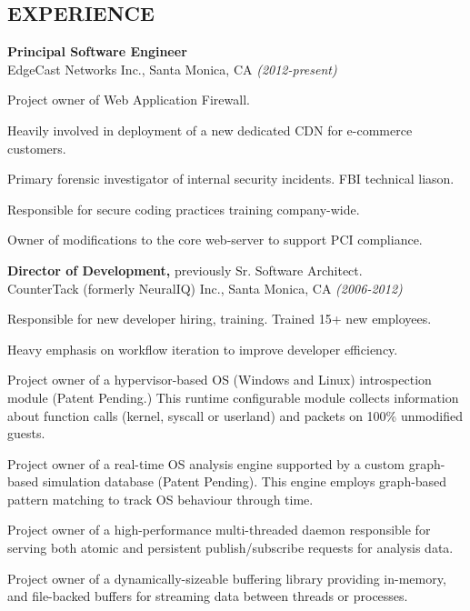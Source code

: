 \documentclass[margin]{res}
\begin{document}
\begin{resume}
\section{EXPERIENCE}
\noindent
{\bf Principal Software Engineer} \\ 
EdgeCast Networks Inc., Santa Monica, CA {\em (2012-present)}
\begin{list}{}{\leftmargin=1.5em \topsep=5pt \partopsep=0pt \parsep=2.5pt}
  \item Project owner of Web Application Firewall.
  \item Heavily involved in deployment of a new dedicated CDN for 
    e-commerce customers.
  \item Primary forensic investigator of internal security incidents.  
    FBI technical liason.
  \item Responsible for secure coding practices training company-wide.
  \item Owner of modifications to the core web-server to support PCI 
    compliance.
\end{list}

{\bf Director of Development,} previously Sr. Software Architect. \\ 
CounterTack (formerly NeuralIQ) Inc., Santa Monica, CA {\em (2006-2012)}
\begin{list}{}{\leftmargin=1.5em \topsep=5pt \partopsep=0pt \parsep=2.5pt}
  \item Responsible for new developer hiring, training.  Trained 15+ 
    new employees.
  \item Heavy emphasis on workflow iteration to improve developer 
    efficiency.
  \item Project owner of a hypervisor-based OS (Windows and
    Linux) introspection module (Patent Pending.)  This runtime
    configurable module collects information about function calls
    (kernel, syscall or userland) and packets on 100\%
    unmodified guests.
  \item Project owner of a real-time OS analysis engine supported by a
    custom graph-based simulation database (Patent Pending).  This
    engine employs graph-based pattern matching to track OS behaviour
    through time.
  \item Project owner of a high-performance multi-threaded daemon
    responsible for serving both atomic and persistent
    publish/subscribe requests for analysis data.
  \item Project owner of a dynamically-sizeable buffering library
    providing in-memory, and file-backed buffers for streaming
    data between threads or processes.
\end{list}


\end{resume}
\end{document}
